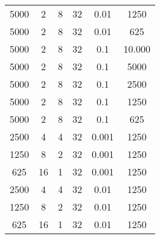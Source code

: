 \begin{tabularx}{\linewidth}{ |c|c|c|c|c|c|  }
    5000 & 2   & 8     & 32  & 0.01  & 1250                                                                                                                               \\
    5000 & 2   & 8     & 32  & 0.01  & 625                                                                                                                                \\
    5000 & 2   & 8     & 32  & 0.1   & 10.000                                                                                                                             \\
    5000 & 2   & 8     & 32  & 0.1   & 5000                                                                                                                               \\
    5000 & 2   & 8     & 32  & 0.1   & 2500                                                                                                                               \\
    5000 & 2   & 8     & 32  & 0.1   & 1250                                                                                                                               \\
    5000 & 2   & 8     & 32  & 0.1   & 625                                                                                                                                \\
    2500 & 4   & 4     & 32  & 0.001 & 1250                                                                                                                               \\
    1250 & 8   & 2     & 32  & 0.001 & 1250                                                                                                                               \\
    625  & 16  & 1     & 32  & 0.001 & 1250                                                                                                                               \\
    2500 & 4   & 4     & 32  & 0.01  & 1250                                                                                                                               \\
    1250 & 8   & 2     & 32  & 0.01  & 1250                                                                                                                               \\
    625  & 16  & 1     & 32  & 0.01  & 1250                                                                                                                               \\

\end{tabularx}
